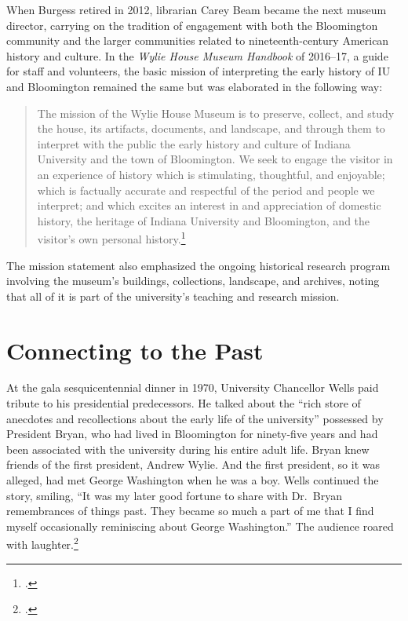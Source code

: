 \documentclass[
  american,
  letterpaper,
]{scrreprt}
\begin{document}
When Burgess retired in 2012, librarian Carey Beam became the next
museum director, carrying on the tradition of engagement with both the
Bloomington community and the larger communities related to
nineteenth-century American history and culture. In the \emph{Wylie
House Museum Handbook} of 2016--17, a guide for staff and volunteers,
the basic mission of interpreting the early history of IU and
Bloomington remained the same but was elaborated in the following way:

\begin{quote}
The mission of the Wylie House Museum is to preserve, collect, and study
the house, its artifacts, documents, and landscape, and through them to
interpret with the public the early history and culture of Indiana
University and the town of Bloomington. We seek to engage the visitor in
an experience of history which is stimulating, thoughtful, and
enjoyable; which is factually accurate and respectful of the period and
people we interpret; and which excites an interest in and appreciation
of domestic history, the heritage of Indiana University and Bloomington,
and the visitor's own personal history.\footnote{.}
\end{quote}

The mission statement also emphasized the ongoing historical research
program involving the museum's buildings, collections, landscape, and
archives, noting that all of it is part of the university's teaching and
research mission.

\section{Connecting to the Past}\label{connecting-to-the-past}

At the gala sesquicentennial dinner in 1970, University Chancellor Wells
paid tribute to his presidential predecessors. He talked about the
``rich store of anecdotes and recollections about the early life of the
university'' possessed by President Bryan, who had lived in Bloomington
for ninety-five years and had been associated with the university during
his entire adult life. Bryan knew friends of the first president, Andrew
Wylie. And the first president, so it was alleged, had met George
Washington when he was a boy. Wells continued the story, smiling, ``It
was my later good fortune to share with Dr.~Bryan remembrances of things
past. They became so much a part of me that I find myself occasionally
reminiscing about George Washington.'' The audience roared with
laughter.\footnote{.}
\end{document}
